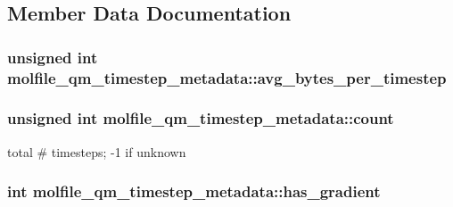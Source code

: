 \subsection{\-Member \-Data \-Documentation}
\hypertarget{structmolfile__qm__timestep__metadata_aee73a56bde14b28027a675fc0f35b966}{
\subsubsection[{avg\-\_\-bytes\-\_\-per\-\_\-timestep}]{\setlength{\rightskip}{0pt plus 5cm}unsigned int {\bf molfile\-\_\-qm\-\_\-timestep\-\_\-metadata\-::avg\-\_\-bytes\-\_\-per\-\_\-timestep}}}\label{structmolfile__qm__timestep__metadata_aee73a56bde14b28027a675fc0f35b966}
\hypertarget{structmolfile__qm__timestep__metadata_a6706e92c87f2759b452130817bf07906}{
\subsubsection[{count}]{\setlength{\rightskip}{0pt plus 5cm}unsigned int {\bf molfile\-\_\-qm\-\_\-timestep\-\_\-metadata\-::count}}}\label{structmolfile__qm__timestep__metadata_a6706e92c87f2759b452130817bf07906}
total \# timesteps; -\/1 if unknown \hypertarget{structmolfile__qm__timestep__metadata_a916247997da0afd2dfe700ab9f268170}{
\subsubsection[{has\-\_\-gradient}]{\setlength{\rightskip}{0pt plus 5cm}int {\bf molfile\-\_\-qm\-\_\-timestep\-\_\-metadata\-::has\-\_\-gradient}}}\label{structmolfile__qm__timestep__metadata_a916247997da0afd2dfe700ab9f268170}
